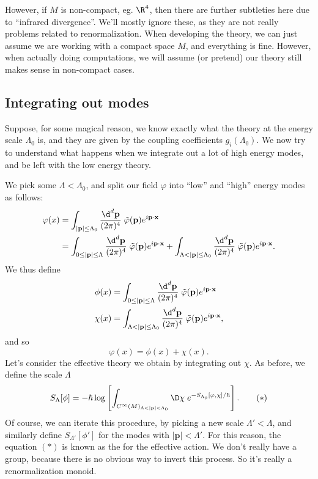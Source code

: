 \documentclass[a4paper]{article}
\begin{document}
However, if $M$ is non-compact, eg. $\R^4$, then there are further subtleties here due to ``infrared divergence''. We'll mostly ignore these, as they are not really problems related to renormalization. When developing the theory, we can just assume we are working with a compact space $M$, and everything is fine. However, when actually doing computations, we will assume (or pretend) our theory still makes sense in non-compact cases.

\subsection{Integrating out modes}
Suppose, for some magical reason, we know exactly what the theory at the energy scale $\Lambda_0$ is, and they are given by the coupling coefficients $g_i(\Lambda_0)$. We now try to understand what happens when we integrate out a lot of high energy modes, and be left with the low energy theory.

We pick some $\Lambda < \Lambda_0$, and split our field $\varphi$ into ``low'' and ``high'' energy modes as follows:
\begin{align*}
  \varphi(x) &= \int_{|\mathbf{p}| \leq \Lambda_0} \frac{\d^d \mathbf{p}}{ (2\pi)^4}\;\tilde{\varphi}(\mathbf{p}) e^{i\mathbf{p}\cdot \mathbf{x}}\\
  &= \int_{0 \leq |\mathbf{p}| \leq \Lambda} \frac{\d^d \mathbf{p}}{ (2\pi)^4}\;\tilde{\varphi}(\mathbf{p}) e^{i\mathbf{p}\cdot \mathbf{x}} + \int_{\Lambda < |\mathbf{p}| \leq \Lambda_0} \frac{\d^d \mathbf{p}}{ (2\pi)^4}\;\tilde{\varphi}(\mathbf{p}) e^{i\mathbf{p}\cdot \mathbf{x}}.
\end{align*}
We thus define
\begin{align*}
  \phi(x) &= \int_{0 \leq |\mathbf{p}| \leq \Lambda} \frac{\d^d \mathbf{p}}{ (2\pi)^4}\;\tilde{\varphi}(\mathbf{p}) e^{i\mathbf{p}\cdot \mathbf{x}} \\
  \chi(x) &= \int_{\Lambda < |\mathbf{p}| \leq \Lambda_0} \frac{\d^d \mathbf{p}}{ (2\pi)^4}\;\tilde{\varphi}(\mathbf{p}) e^{i\mathbf{p}\cdot \mathbf{x}},
\end{align*}
and so
\[
  \varphi(x) = \phi(x) + \chi(x).
\]
Let's consider the effective theory we obtain by integrating out $\chi$. As before, we define the scale $\Lambda$ 
\[
  S_\Lambda[\phi] = -\hbar \log \left[\int_{C^\infty(M)_{\Lambda < |\mathbf{p}| < \Lambda_0}} \D \chi\; e^{-S_{\Lambda_0}[\varphi, \chi]/\hbar}\right]. \tag{$*$}
\]
Of course, we can iterate this procedure, by picking a new scale $\Lambda' < \Lambda$, and similarly define $S_{\Lambda'}[\phi']$ for the modes with $|\mathbf{p}| < \Lambda'$. For this reason, the equation $(*)$ is known as the  for the effective action. We don't really have a group, because there is no obvious way to invert this process. So it's really a renormalization monoid.
\end{document}
